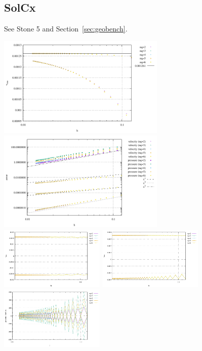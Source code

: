 \newpage
\subsection*{SolCx}

See Stone 5 and Section~\ref{sec:geobench}.

\begin{center}
\includegraphics[width=8cm]{python_codes/fieldstone_80/results/solcx/vrms}
\includegraphics[width=8cm]{python_codes/fieldstone_80/results/solcx/errors}\\
\includegraphics[width=5cm]{python_codes/fieldstone_80/results/solcx/stats_u}
\includegraphics[width=5cm]{python_codes/fieldstone_80/results/solcx/stats_v}
\includegraphics[width=5cm]{python_codes/fieldstone_80/results/solcx/stats_p}\\
\end{center}


